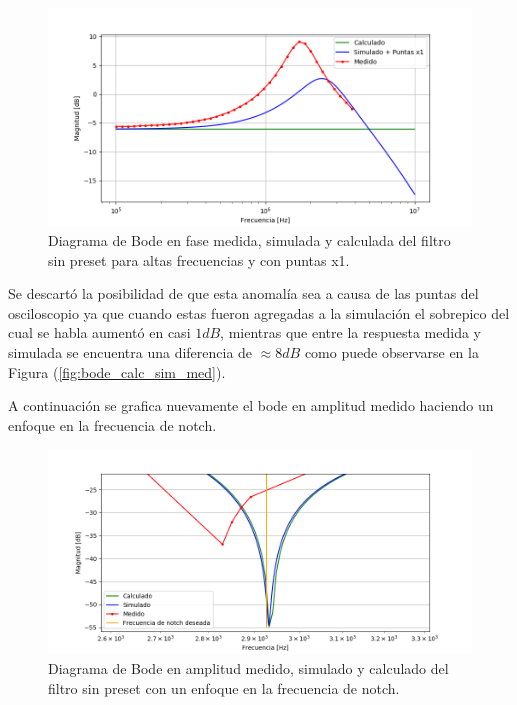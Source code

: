 \begin{figure}[H]
	\centering
	\includegraphics[width=\textwidth]{Imagenes1/bode_calc_sim_med_highf.PNG}
	\caption{Diagrama de Bode en fase medida, simulada y calculada del filtro sin preset para altas frecuencias y con puntas x1.}
	\label{fig:bodefase_calc_sim_med_highf}
\end{figure}

Se descartó la posibilidad de que esta anomalía sea a causa de las puntas del osciloscopio ya que cuando estas fueron agregadas a la simulación el sobrepico del cual se habla aumentó en casi $1dB$, mientras que entre la respuesta medida y simulada se encuentra una diferencia de $\approx 8dB$ como puede observarse en la Figura (\ref{fig:bode_calc_sim_med}).

A continuación se grafica nuevamente el bode en amplitud medido haciendo un enfoque en la frecuencia de notch.

\begin{figure}[H]
	\centering
	\includegraphics[width=\textwidth]{Imagenes1/bode_calc_sim_med_notch.PNG}
	\caption{Diagrama de Bode en amplitud medido, simulado y calculado del filtro sin preset con un enfoque en la frecuencia de notch.}
	\label{fig:bodefase_calc_sim_med_notch}
\end{figure}

